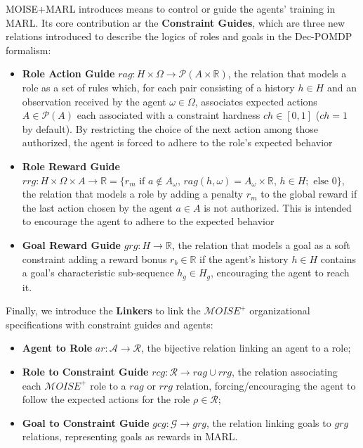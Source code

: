 \noindent MOISE+MARL introduces means to control or guide the agents' training in MARL. Its core contribution ar the \textbf{Constraint Guides}, which are three new relations introduced to describe the logics of roles and goals in the Dec-POMDP formalism:
%
\begin{itemize}
    
    \item \textbf{Role Action Guide} \quad $rag: H \times \Omega \rightarrow \mathcal{P}(A \times \mathbb{R})$, the relation that models a role as a set of rules which, for each pair consisting of a history $h \in H$ and an observation received by the agent $\omega \in \Omega$, associates expected actions $A \in \mathcal{P}(A)$ each associated with a constraint hardness $ch \in [0,1]$ ($ch = 1$ by default). By restricting the choice of the next action among those authorized, the agent is forced to adhere to the role's expected behavior
    \item \textbf{Role Reward Guide} \quad $rrg: H \times \Omega \times A \to \mathbb{R} = \{r_m \text{ if } a \notin A_\omega \text{, } rag(h, \omega) \allowbreak = \allowbreak A_\omega \times \mathbb{R} \text{, } h \in H; \text{ else } 0\}$, the relation that models a role by adding a penalty $r_m$ to the global reward if the last action chosen by the agent $a \in A$ is not authorized. This is intended to encourage the agent to adhere to the expected behavior
    \item \textbf{Goal Reward Guide} \quad $grg: H \rightarrow \mathbb{R}$, the relation that models a goal as a soft constraint adding a reward bonus $r_b \in \mathbb{R}$ if the agent's history $h \in H$ contains a goal's characteristic sub-sequence $h_g \in H_g$, encouraging the agent to reach it.
\end{itemize}

\noindent Finally, we introduce the \textbf{Linkers} to link the $\mathcal{M}OISE^+$ organizational specifications with constraint guides and agents:
%
\begin{itemize}
    
    \item \textbf{Agent to Role} \quad $ar: \mathcal{A} \to \mathcal{R}$, the bijective relation linking an agent to a role;
    \item \textbf{Role to Constraint Guide} \quad $rcg: \mathcal{R} \rightarrow rag \cup rrg$, the relation associating each $\mathcal{M}OISE^+$ role to a $rag$ or $rrg$ relation, forcing/encouraging the agent to follow the expected actions for the role $\rho \in \mathcal{R}$;
    \item \textbf{Goal to Constraint Guide} \quad $gcg: \mathcal{G} \rightarrow grg$, the relation linking goals to $grg$ relations, representing goals as rewards in MARL.
\end{itemize}

